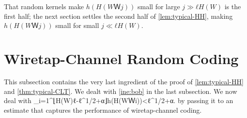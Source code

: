 \documentclass[openany]{amsbook}
\numberwithin{equation}{chapter}
\numberwithin{figure}{chapter}
\numberwithin{table}{chapter}
\def\[#1\]{\begin{equation*}{#1}\end{equation*}}
\theoremstyle{definition}	理dfn:Definition~?s			理exa:Example~?s
\theoremstyle{remark}		理cla:Claim~?s				理rem:Remark~?s
\def\tagcopy#1{\tag{\eqref{#1}'s copy}}
\begin{document}
	That random kernels make $h(H(WＷj))$ small for large $j≫ℓH(W)$ is the first half;
	the next section settles the second half of \cref{lem:typical-HH},
	making $h(H(WＷj))$ small for small $j≪ℓH(W)$.

\section{Wiretap-Channel Random Coding}\label{sec:hayashi}

	This subsection contains the very last ingredient
	of the proof of \cref{lem:typical-HH} and \cref{thm:typical-CLT}.
	We dealt with \cref{ine:bob} in the last subsection.
	We now deal with
	\[∑_{i=1}^{⌊H(W)ℓ-ℓ^{1/2+α}⌋}h(H(WＷi))<ℓ^{1/2+α}.\tagcopy{ine:eve}\]
	by passing it to an estimate that captures
	the performance of wiretap-channel coding.
	
\end{document}
